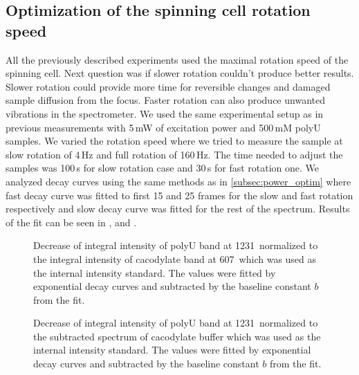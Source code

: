 \subsection{Optimization of the spinning cell rotation speed}

All the previously described experiments used the maximal rotation speed of
the spinning cell.
Next question was if slower rotation couldn't produce better results.
Slower rotation could provide more time for reversible changes and damaged
sample diffusion from the focus.
Faster rotation can also produce unwanted vibrations in the spectrometer.
We used the same experimental setup as in previous measurements with 5\,mW of
excitation power and 500\,mM polyU samples.
We varied the rotation speed where we tried to measure the sample at slow
rotation of 4\,Hz and full rotation of 160\,Hz.
The time needed to adjust the samples was 100\,s for slow rotation case and
30\,s for fast rotation one.
We analyzed decay curves using the same methods as in
\cref{subsec:power_optim}
where fast decay curve was fitted to first 15 and 25 frames for the slow and
fast rotation respectively and slow decay curve was fitted for the rest of
the spectrum.
Results of the fit can be seen in
,
and
.

\begin{figure}
	\centering
	
	\caption{Decrease of integral intensity of polyU band at 1231\,\icm{}
		normalized to the integral intensity of cacodylate band at 607\,\icm{}
		which was used as the internal intensity standard. The values were fitted
		by exponential decay curves  and subtracted
		by the baseline constant $b$ from the fit.}
	\label{\figlabel{rotation_optim:fast_decay}}
\end{figure}

\begin{figure}
	\centering
	
	\caption{Decrease of integral intensity of polyU band at 1231\,\icm{}
		normalized to the subtracted spectrum of cacodylate buffer which was used
		as the internal intensity standard. The values were fitted by exponential
		decay curves  and subtracted by the baseline
		constant $b$ from the fit.}
	\label{\figlabel{rotation_optim:slow_decay}}
\end{figure}

